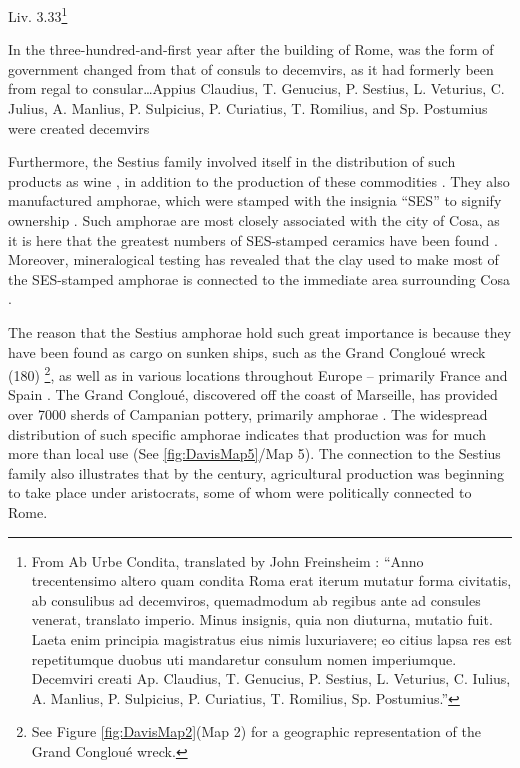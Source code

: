 \begin{aquote}{Liv. 3.33\footnote{From Ab Urbe Condita, translated by John Freinsheim \textcite{Livy_1744}: “Anno trecentensimo altero quam condita Roma erat iterum mutatur forma civitatis, ab consulibus ad decemviros, quemadmodum ab regibus ante ad consules venerat, translato imperio. Minus insignis, quia non diuturna, mutatio fuit. Laeta enim principia magistratus eius nimis luxuriavere; eo citius lapsa res est repetitumque duobus uti mandaretur consulum nomen imperiumque. Decemviri creati Ap. Claudius, T. Genucius, P. Sestius, L. Veturius, C. Iulius, A. Manlius, P. Sulpicius, P. Curiatius, T. Romilius, Sp. Postumius.”}}
	
In the three-hundred-and-first year after the building of Rome, was the form of government changed from that of consuls to decemvirs, as it had formerly been from regal to consular…Appius Claudius, T. Genucius, P. Sestius, L. Veturius, C. Julius, A. Manlius, P. Sulpicius, P. Curiatius, T. Romilius, and Sp. Postumius were created decemvirs
\end{aquote}
Furthermore, the Sestius family involved itself in the distribution of such products as wine \parencites[16]{Purcell_1985}[119]{Storey_2004}, in addition to the production of these commodities \parencite[293]{Wilson_2012}. They also manufactured amphorae, which were stamped with the insignia “SES” to signify ownership \parencite[342--344]{Will_1979}. Such amphorae are most closely associated with the city of Cosa, as it is here that the greatest numbers of SES-stamped ceramics have been found \parencite[129]{Manacorda_1978}. Moreover, mineralogical testing has revealed that the clay used to make most of the SES-stamped amphorae is connected to the immediate area surrounding Cosa \parencite[345]{Will_1979}. 

The reason that the Sestius amphorae hold such great importance is because they have been found as cargo on sunken ships, such as the Grand Congloué wreck (180\BC)
\footnote{See Figure \ref{fig:DavisMap2}(Map 2) for a geographic representation of the Grand Congloué wreck.}, as well as in various locations throughout Europe – primarily France and Spain \parencite[125--127]{Manacorda_1978}. The Grand Congloué, discovered off the coast of Marseille, has provided over \num{7000} sherds of Campanian pottery, primarily amphorae \parencite{Strauss_2013}. The widespread distribution of such specific amphorae indicates that production was for much more than local use (See \ref{fig:DavisMap5}/Map 5). The connection to the Sestius family also illustrates that by the  century\BC, agricultural production was beginning to take place under aristocrats, some of whom were politically connected to Rome.

